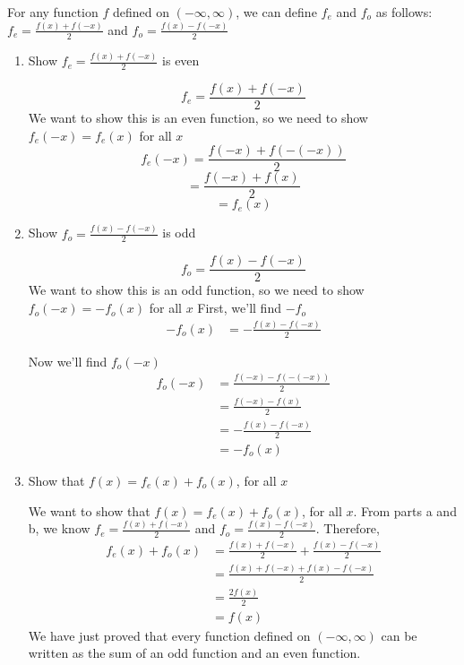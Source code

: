 \documentclass[nooutcomes, noinstructornotes]{ximera}
\begin{document}
\begin{problem}
For any function $f$ defined on $(-\infty,\infty)$, we can define $f_e$ and $f_o$ as follows: $f_e=\frac{f(x)+f(-x)}{2}$ and $f_o=\frac{f(x)-f(-x)}{2}$


\begin{enumerate}	
	\item  Show  $f_e=\frac{f(x)+f(-x)}{2}$  is even
		\begin{freeResponse}	
			 $$f_e=\frac{f(x)+f(-x)}{2}$$
			We want to show this is an even function, so we need to show $f_e(-x)=f_e(x)$ for all $x$
			$$f_e(-x)=\frac{f(-x)+f(-(-x))}{2}$$ 
			$$=\frac{f(-x)+f(x)}{2}$$
			$$=f_e(x)$$
		\end{freeResponse}

	\item  Show $f_o=\frac{f(x)-f(-x)}{2}$ is odd
		\begin{freeResponse}	
			 $$f_o=\frac{f(x)-f(-x)}{2}$$
			We want to show this is an odd function, so we need to show $f_o(-x)=-f_o(x)$ for all $x$
			First, we'll find $-f_o$
			\begin{align*}
			-f_o(x)&=-\frac{f(x)-f(-x)}{2}
			\end{align*}

			Now we'll find $f_o(-x)$
			\begin{align*}
			f_o(-x)&=\frac{f(-x)-f(-(-x))}{2}\\
			&=\frac{f(-x)-f(x)}{2}\\
			&=-\frac{f(x)-f(-x)}{2}\\
			&=-f_o(x)
			\end{align*}
			
		\end{freeResponse}
	\item Show that $f(x)=f_e(x)+f_o(x)$, for all $x$
		\begin{freeResponse}
		
		We want to show that $f(x)=f_e(x)+f_o(x)$, for all $x$.  From parts a and b, we know $f_e=\frac{f(x)+f(-x)}{2}$ and $f_o=\frac{f(x)-f(-x)}{2}$.  Therefore,
			\begin{align*}
			f_e(x)+f_o(x)&=\frac{f(x)+f(-x)}{2}+\frac{f(x)-f(-x)}{2}\\
			&=\frac{f(x)+f(-x)+f(x)-f(-x)}{2}\\
			&=\frac{2f(x)}{2}\\
			&=f(x)
			\end{align*}
		We have just proved that every function defined on $(-\infty,\infty)$ can be written as the sum of an odd function and an even function.
	
		\end{freeResponse}	
	\end{enumerate}
	

\end{problem}
\end{document}
